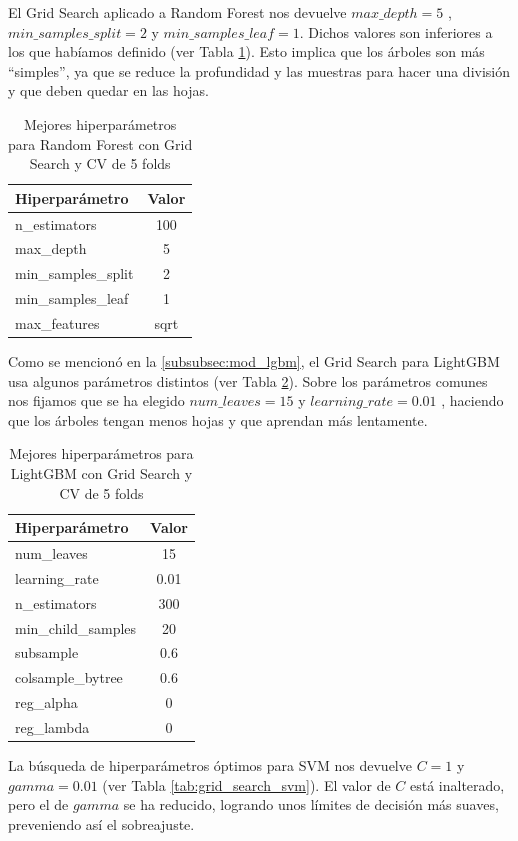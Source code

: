 El Grid Search aplicado a Random Forest nos devuelve $max\_depth=5$ , $min\_samples\_split=2$ y $min\_samples\_leaf=1$. Dichos valores son inferiores a los que habíamos definido (ver Tabla \ref{tab:grid_search_rf}). Esto implica que los árboles son más ``simples'', ya que se reduce la profundidad y las muestras para hacer una división y que deben quedar en las hojas. 

\begin{table}
\centering
\begin{tabular}{lc}
\toprule
\textbf{Hiperparámetro} & \textbf{Valor}\\
\midrule
n\_estimators & 100 \\
max\_depth & 5 \\
min\_samples\_split & 2 \\
min\_samples\_leaf & 1  \\
max\_features & sqrt \\
\bottomrule
\end{tabular}
\caption{Mejores hiperparámetros para Random Forest con Grid Search y CV de 5 folds}
\label{tab:grid_search_rf}
\end{table}

Como se mencionó en la \autoref{subsubsec:mod_lgbm}, el Grid Search para LightGBM usa algunos parámetros distintos (ver Tabla \ref{tab:grid_search_lgbm}). Sobre los parámetros comunes nos fijamos que se ha elegido $num\_leaves=15$ y $learning\_rate=0.01$ , haciendo que los árboles tengan menos hojas y que aprendan más lentamente.

\begin{table}
\centering
\begin{tabular}{lc}
\toprule
\textbf{Hiperparámetro} & \textbf{Valor}\\
\midrule
num\_leaves & 15 \\
learning\_rate & 0.01 \\
n\_estimators & 300 \\
min\_child\_samples & 20  \\
subsample & 0.6 \\
colsample\_bytree & 0.6 \\
reg\_alpha & 0 \\
reg\_lambda & 0 \\
\bottomrule
\end{tabular}
\caption{Mejores hiperparámetros para LightGBM con Grid Search y CV de 5 folds}
\label{tab:grid_search_lgbm}
\end{table}

La búsqueda de hiperparámetros óptimos para SVM nos devuelve $C=1$ y $gamma=0.01$ (ver Tabla \ref{tab:grid_search_svm}). El valor de $C$ está inalterado, pero el de $gamma$ se ha reducido, logrando unos límites de decisión más suaves, preveniendo así el sobreajuste.

